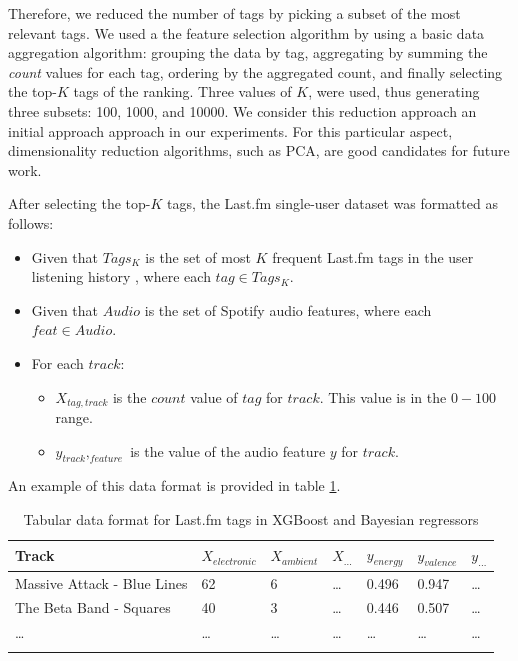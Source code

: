 \documentclass[sn-mathphys]{sn-jnl}%
\theoremstyle{thmstyleone}%
\theoremstyle{thmstyletwo}%
\theoremstyle{thmstylethree}%
\begin{document}
Therefore, we reduced the number of tags by picking a subset of the most relevant tags.
We used a the feature selection algorithm by using a basic data aggregation algorithm: grouping the data by tag, aggregating by summing the \emph{count} values for each tag,
ordering by the aggregated count, and finally selecting the top-$K$ tags of the ranking.
Three values of $K$, were used, thus generating three subsets: \num{100}, \num{1000}, and \num{10000}.
We consider this reduction approach an initial approach approach in our experiments.
For this particular aspect, dimensionality reduction algorithms, such as PCA, are good candidates for future work.

After selecting the top-$K$ tags, the Last.fm single-user dataset was formatted as follows:

\begin{itemize}
      \item Given that $Tags_{K}$ is the set of most $K$ frequent Last.fm tags in the user listening history
            , where each $tag \in Tags_{K}$.
      \item Given that $Audio$ is the set of Spotify audio features, where each $feat \in Audio$.
      \item For each $track$:
      \begin{itemize}
            \item $X_{tag,track}$ is the $count$ value of $tag$ for $track$. This value is in the $0-100$ range.
            \item $y_{track},_{feature}$ is the value of the audio feature $y$ for $track$.
      \end{itemize}
\end{itemize}

An example of this data format is provided in table \ref{tabular_tags_format}.

\begin{table}[h]
      \begin{center}
      \begin{minipage}{\textwidth}
      \caption{Tabular data format for Last.fm tags in XGBoost and Bayesian regressors}\label{tabular_tags_format}%
      \begin{tabular}{@{}lllllll@{}}
      \toprule
      Track                         & $X_{electronic}$ & $X_{ambient}$ & $X_{\dots}$ & $y_{energy}$ & $y_{valence}$ & $y_{\dots}$ \\
      \midrule
      Massive Attack - Blue Lines   & 62               & 6             &  \dots      & 0.496        & 0.947         & \dots  \\
      The Beta Band - Squares       & 40               & 3             &  \dots      & 0.446        & 0.507         & \dots  \\
      \dots                         & \dots            & \dots         &  \dots      & \dots        & \dots         & \dots  \\
      \botrule
      \end{tabular}
      \end{minipage}
      \end{center}
\end{table}
\end{document}
